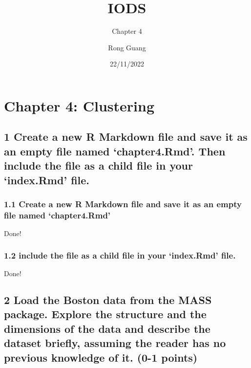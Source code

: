 \documentclass[
]{article}
\title{IODS}
\subtitle{Chapter 4}
\author{Rong Guang}
\date{22/11/2022}
\begin{document}
\maketitle

{
\setcounter{tocdepth}{3}
\tableofcontents
}
\hypertarget{chapter-4-clustering}{%
\section{\texorpdfstring{\textbf{Chapter 4:
Clustering}}{Chapter 4: Clustering}}\label{chapter-4-clustering}}

\hypertarget{create-a-new-r-markdown-file-and-save-it-as-an-empty-file-named-chapter4.rmd.-then-include-the-file-as-a-child-file-in-your-index.rmd-file.}{%
\subsection{1 Create a new R Markdown file and save it as an empty file
named `chapter4.Rmd'. Then include the file as a child file in your
`index.Rmd'
file.}\label{create-a-new-r-markdown-file-and-save-it-as-an-empty-file-named-chapter4.rmd.-then-include-the-file-as-a-child-file-in-your-index.rmd-file.}}

\hypertarget{create-a-new-r-markdown-file-and-save-it-as-an-empty-file-named-chapter4.rmd}{%
\subsubsection{1.1 Create a new R Markdown file and save it as an empty
file named
`chapter4.Rmd'}\label{create-a-new-r-markdown-file-and-save-it-as-an-empty-file-named-chapter4.rmd}}

Done!

\hypertarget{include-the-file-as-a-child-file-in-your-index.rmd-file.}{%
\subsubsection{1.2 include the file as a child file in your `index.Rmd'
file.}\label{include-the-file-as-a-child-file-in-your-index.rmd-file.}}

Done!

\hypertarget{load-the-boston-data-from-the-mass-package.-explore-the-structure-and-the-dimensions-of-the-data-and-describe-the-dataset-briefly-assuming-the-reader-has-no-previous-knowledge-of-it.-0-1-points}{%
\subsection{2 Load the Boston data from the MASS package. Explore the
structure and the dimensions of the data and describe the dataset
briefly, assuming the reader has no previous knowledge of it. (0-1
points)}\label{load-the-boston-data-from-the-mass-package.-explore-the-structure-and-the-dimensions-of-the-data-and-describe-the-dataset-briefly-assuming-the-reader-has-no-previous-knowledge-of-it.-0-1-points}}
\end{document}
